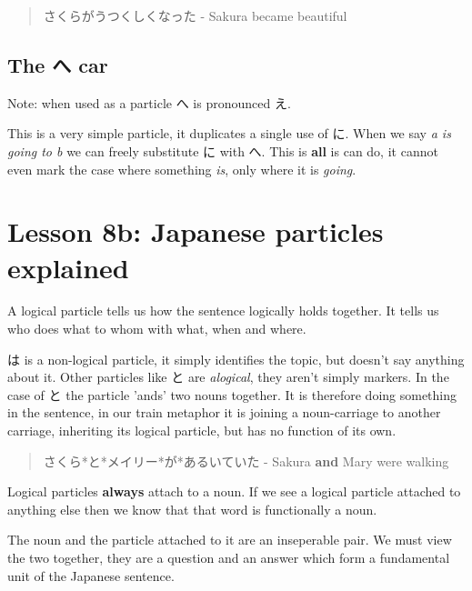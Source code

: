 \documentclass[11pt]{article}
\begin{document}
\begin{quote}
さくらがうつくしくなった - Sakura became beautiful
\end{quote}

\subsection{The へ car}
\label{sec:org4b84df6}
Note: when used as a particle へ is pronounced え.

This is a very simple particle, it duplicates a single use of に. When we say \emph{a is going to b} we can freely substitute に with へ. This is \textbf{all} is can do, it cannot even mark the case where something \emph{is}, only where it is \emph{going}.
\section{Lesson 8b: Japanese particles explained}
\label{sec:org469f7ea}
A logical particle tells us how the sentence logically holds together. It tells us who does what to whom with what, when and where.

は is a non-logical particle, it simply identifies the topic, but doesn't say anything about it. Other particles like と are \emph{alogical}, they aren't simply markers. In the case of と the particle 'ands' two nouns together. It is therefore doing something in the sentence, in our train metaphor it is joining a noun-carriage to another carriage, inheriting its logical particle, but has no function of its own.
\begin{quote}
さくら*と*メイリー*が*あるいていた - Sakura \textbf{and} Mary were walking
\end{quote}

Logical particles \textbf{always} attach to a noun. If we see a logical particle attached to anything else then we know that that word is functionally a noun.

The noun and the particle attached to it are an inseperable pair. We must view the two together, they are a question and an answer which form a fundamental unit of the Japanese sentence.
\end{document}
